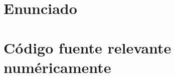 \appendix

\section{Enunciado}
\label{ap:enunciado}


\section{Código fuente relevante numéricamente}
